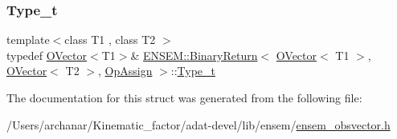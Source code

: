 \subsubsection{\texorpdfstring{Type\_t}{Type\_t}\hspace{0.1cm}{\footnotesize\ttfamily [3/3]}}
{\footnotesize\ttfamily template$<$class T1 , class T2 $>$ \\
typedef \mbox{\hyperlink{classENSEM_1_1OVector}{O\+Vector}}$<$T1$>$\& \mbox{\hyperlink{structENSEM_1_1BinaryReturn}{E\+N\+S\+E\+M\+::\+Binary\+Return}}$<$ \mbox{\hyperlink{classENSEM_1_1OVector}{O\+Vector}}$<$ T1 $>$, \mbox{\hyperlink{classENSEM_1_1OVector}{O\+Vector}}$<$ T2 $>$, \mbox{\hyperlink{structENSEM_1_1OpAssign}{Op\+Assign}} $>$\+::\mbox{\hyperlink{structENSEM_1_1BinaryReturn_3_01OVector_3_01T1_01_4_00_01OVector_3_01T2_01_4_00_01OpAssign_01_4_ab2b693bbb295f9694204d3198d251aeb}{Type\+\_\+t}}}



The documentation for this struct was generated from the following file\+:\begin{DoxyCompactItemize}
\item 
/\+Users/archanar/\+Kinematic\+\_\+factor/adat-\/devel/lib/ensem/\mbox{\hyperlink{adat-devel_2lib_2ensem_2ensem__obsvector_8h}{ensem\+\_\+obsvector.\+h}}\end{DoxyCompactItemize}
